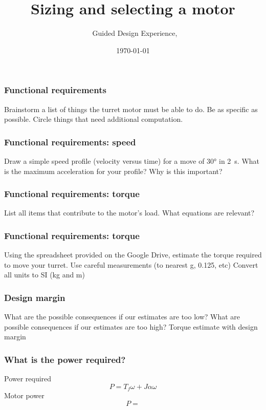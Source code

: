 \documentclass[aspectratio=169]{beamer}
\title{Sizing and selecting a motor}
\subtitle{\usnaCourseNumber\ Guided Design Experience, \usnaCourseTerm}
\author{\usnaInstructorShort}
\date{\today}
\begin{document}
\settitlebg
\begin{frame}
\titlepage
\end{frame}

\setslidebg
\begin{frame}
\frametitle{Functional requirements}
Brainstorm a list of things the turret motor must be able to do. 
Be as specific as possible.
Circle things that need additional computation.
\end{frame}

\begin{frame}
\frametitle{Functional requirements: speed}
Draw a simple speed profile (velocity versus time) for a move of \ang{30} in \SI{2}{\second}. What is the maximum acceleration for your profile? Why is this important? 
\end{frame}

\begin{frame}
\frametitle{Functional requirements: torque}
List all items that contribute to the motor's load. What equations are relevant? 
\end{frame}

\begin{frame}
\frametitle{Functional requirements: torque}
Using the spreadsheet provided on the Google Drive, estimate the torque required to move your turret. 
Use careful measurements (to nearest \si{\gram}, \SI{0.125}{\inch}, etc)
Convert all units to SI (\si{\kilo\gram} and \si{\meter})
\end{frame}

\begin{frame}
\frametitle{Design margin}
What are the possible consequences if our estimates are too low?
What are possible consequences if our estimates are too high?
Torque estimate with design margin
\end{frame}

\begin{frame}
\frametitle{What is the power required?}
Power required
\begin{equation}
P = T_f\omega + J\alpha\omega
\end{equation}
Motor power
\begin{equation}
P = 
\end{equation}
\end{frame}
\end{document}
